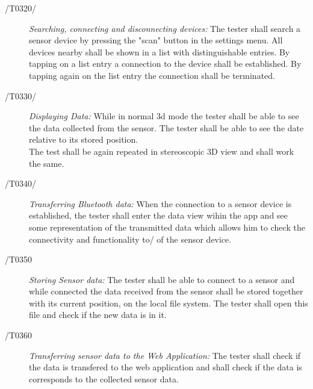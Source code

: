 \begin{description}
	\item[/T0320/]
	\textit{Searching, connecting and disconnecting devices:} The tester shall search a sensor device by pressing the "scan" button in the settings menu. All devices nearby shall be shown in a list with distinguishable entries. By tapping on a list entry a connection to the device shall be established.
	By tapping again on the list entry the connection shall be terminated.
\end{description}

\begin{description}
	\item[/T0330/]
	\textit{Displaying Data:} While in normal 3d mode the tester shall be able to see the data collected from the sensor. The tester shall be able to see
  the date relative to its stored position. \\
  The test shall be again repeated in stereoscopic 3D view and shall work the same.
\end{description}

\begin{description}
	\item[/T0340/]
	\textit{Transferring Bluetooth data:} When the connection to a sensor device is established, the tester shall enter the data view wihin the app and see some representation of the transmitted data which allows him to check the connectivity and functionality to/ of the sensor device.
\end{description}

\begin{description}
  \item[/T0350]
  \textit{Storing Sensor data:} The tester shall be able to connect to a sensor and while connected the data received from the sensor shall be stored together with its current position,
  on the local file system. The tester shall open this file and check if the new data is in it.
\end{description}

\begin{description}
  \item[/T0360]
  \textit{Transferring sensor data to the Web Application:} The tester shall check if the data is transfered to the web application and shall check
  if the data is corresponds to the collected sensor data.
\end{description}
